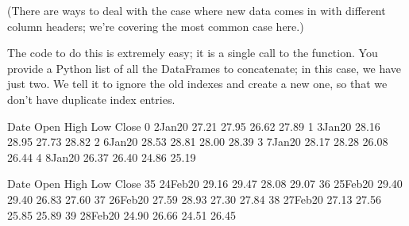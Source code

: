 \documentclass[letterpaper,10pt,english]{jupyterBook}
\begin{document}
\sphinxAtStartPar
(There are ways to deal with the case where new data comes in with different column headers; we’re covering the most common case here.)

\sphinxAtStartPar
The code to do this is extremely easy; it is a single call to the  function.  You provide a Python list of all the DataFrames to concatenate; in this case, we have just two.  We tell it to ignore the old indexes and create a new one, so that we don’t have duplicate index entries.

\begin{sphinxVerbatim}[commandchars=\\\{\}]
   

    
    

   \PYG{p}{[}   \PYG{p}{]}  
\end{sphinxVerbatim}

\begin{sphinxVerbatim}[commandchars=\\\{\}]
       Date   Open   High    Low  Close
0  2\PYGZhy{}Jan\PYGZhy{}20  27.21  27.95  26.62  27.89
1  3\PYGZhy{}Jan\PYGZhy{}20  28.16  28.95  27.73  28.82
2  6\PYGZhy{}Jan\PYGZhy{}20  28.53  28.81  28.00  28.39
3  7\PYGZhy{}Jan\PYGZhy{}20  28.17  28.28  26.08  26.44
4  8\PYGZhy{}Jan\PYGZhy{}20  26.37  26.40  24.86  25.19
\end{sphinxVerbatim}

\begin{sphinxVerbatim}[commandchars=\\\{\}]
\end{sphinxVerbatim}

\begin{sphinxVerbatim}[commandchars=\\\{\}]
         Date   Open   High    Low  Close
35  24\PYGZhy{}Feb\PYGZhy{}20  29.16  29.47  28.08  29.07
36  25\PYGZhy{}Feb\PYGZhy{}20  29.40  29.40  26.83  27.60
37  26\PYGZhy{}Feb\PYGZhy{}20  27.59  28.93  27.30  27.84
38  27\PYGZhy{}Feb\PYGZhy{}20  27.13  27.56  25.85  25.89
39  28\PYGZhy{}Feb\PYGZhy{}20  24.90  26.66  24.51  26.45
\end{sphinxVerbatim}
\end{document}
